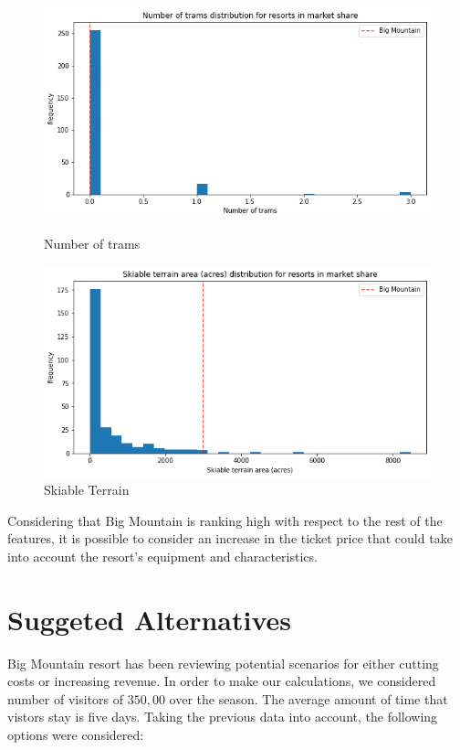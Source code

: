 \documentclass[twocolumn, 12pt]{article}
\begin{document}
\begin{figure}[!htb]
	\begin{minipage}{0.24\textwidth}
		\centering
		\includegraphics[width=\linewidth]{numbertrams.png}
		\caption{Number of trams}\label{numbertrams}
	\end{minipage}\hfill
	\begin {minipage}{0.24\textwidth}
	\centering
	\includegraphics[width=\linewidth]{skiableterrainarea.png}
	\caption{Skiable Terrain}\label{skiableterrain}
\end{minipage}
\end{figure}

Considering that Big Mountain is ranking high with respect to the rest of the features, it is possible to consider an increase in the ticket price that could take into account the resort's equipment and characteristics.

\section{Suggeted Alternatives}

\noindent
Big Mountain resort has been reviewing potential scenarios for either cutting costs or increasing revenue. In order to make our calculations, we considered number of visitors of $350,00$ over the season. The average amount of time that  vistors stay is five days. Taking the previous data into account, the following options were considered:
\end{document}
